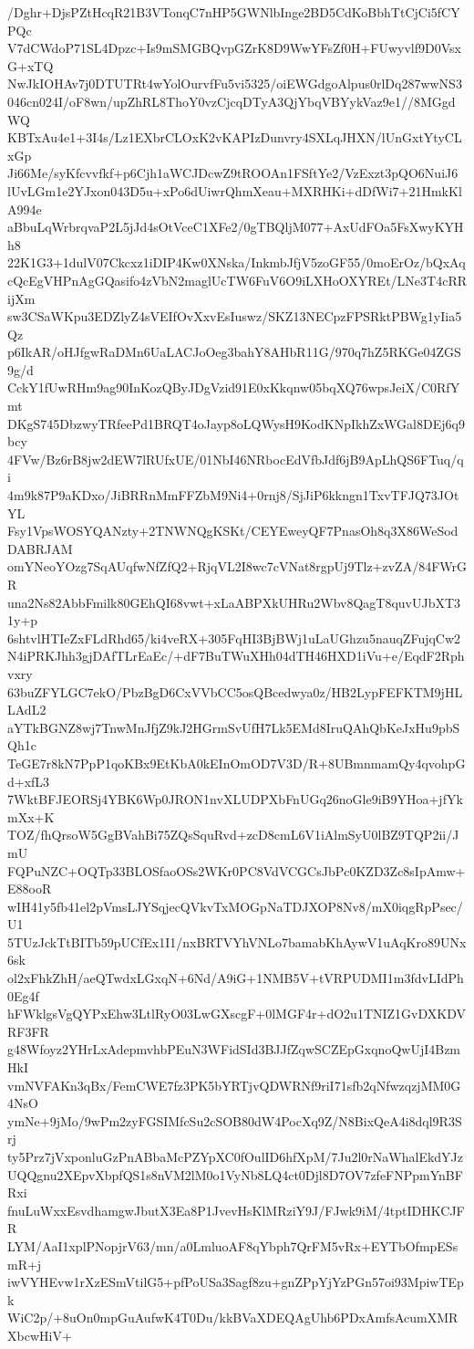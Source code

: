 /Dghr+DjsPZtHcqR21B3VTonqC7nHP5GWNlbInge2BD5CdKoBbhTtCjCi5fCYPQc
V7dCWdoP71SL4Dpzc+Is9mSMGBQvpGZrK8D9WwYFsZf0H+FUwyvlf9D0VsxG+xTQ
NwJkIOHAv7j0DTUTRt4wYolOurvfFu5vi5325/oiEWGdgoAlpus0rlDq287wwNS3
046cn024I/oF8wn/upZhRL8ThoY0vzCjcqDTyA3QjYbqVBYykVaz9e1//8MGgdWQ
KBTxAu4e1+3I4s/Lz1EXbrCLOxK2vKAPIzDunvry4SXLqJHXN/lUnGxtYtyCLxGp
Ji66Me/syKfcvvfkf+p6Cjh1aWCJDcwZ9tROOAn1FSftYe2/VzExzt3pQO6NuiJ6
lUvLGm1e2YJxon043D5u+xPo6dUiwrQhmXeau+MXRHKi+dDfWi7+21HmkKlA994e
aBbuLqWrbrqvaP2L5jJd4sOtVceC1XFe2/0gTBQljM077+AxUdFOa5FsXwyKYHh8
22K1G3+1dulV07Ckcxz1iDIP4Kw0XNska/InkmbJfjV5zoGF55/0moErOz/bQxAq
cQcEgVHPnAgGQasifo4zVbN2maglUcTW6FuV6O9iLXHoOXYREt/LNe3T4cRRijXm
sw3CSaWKpu3EDZlyZ4sVEIfOvXxvEsIuswz/SKZ13NECpzFPSRktPBWg1yIia5Qz
p6IkAR/oHJfgwRaDMn6UaLACJoOeg3bahY8AHbR11G/970q7hZ5RKGe04ZGS9g/d
CckY1fUwRHm9ag90InKozQByJDgVzid91E0xKkqnw05bqXQ76wpsJeiX/C0RfYmt
DKgS745DbzwyTRfeePd1BRQT4oJayp8oLQWysH9KodKNpIkhZxWGal8DEj6q9bcy
4FVw/Bz6rB8jw2dEW7lRUfxUE/01NbI46NRbocEdVfbJdf6jB9ApLhQS6FTuq/qi
4m9k87P9aKDxo/JiBRRnMmFFZbM9Ni4+0rnj8/SjJiP6kkngn1TxvTFJQ73JOtYL
Fsy1VpsWOSYQANzty+2TNWNQgKSKt/CEYEweyQF7PnasOh8q3X86WeSodDABRJAM
omYNeoYOzg7SqAUqfwNfZfQ2+RjqVL2I8wc7cVNat8rgpUj9Tlz+zvZA/84FWrGR
una2Ns82AbbFmilk80GEhQI68vwt+xLaABPXkUHRu2Wbv8QagT8quvUJbXT31y+p
6shtvlHTIeZxFLdRhd65/ki4veRX+305FqHI3BjBWj1uLaUGhzu5nauqZFujqCw2
N4iPRKJhh3gjDAfTLrEaEc/+dF7BuTWuXHh04dTH46HXD1iVu+e/EqdF2Rphvxry
63buZFYLGC7ekO/PbzBgD6CxVVbCC5osQBcedwya0z/HB2LypFEFKTM9jHLLAdL2
aYTkBGNZ8wj7TnwMnJfjZ9kJ2HGrmSvUfH7Lk5EMd8IruQAhQbKeJxHu9pbSQh1c
TeGE7r8kN7PpP1qoKBx9EtKbA0kEInOmOD7V3D/R+8UBmnmamQy4qvohpGd+xfL3
7WktBFJEORSj4YBK6Wp0JRON1nvXLUDPXbFnUGq26noGle9iB9YHoa+jfYkmXx+K
TOZ/fhQrsoW5GgBVahBi75ZQsSquRvd+zcD8cmL6V1iAlmSyU0lBZ9TQP2ii/JmU
FQPuNZC+OQTp33BLOSfaoOSs2WKr0PC8VdVCGCsJbPc0KZD3Zc8sIpAmw+E88ooR
wIH41y5fb41el2pVmsLJYSqjecQVkvTxMOGpNaTDJXOP8Nv8/mX0iqgRpPsec/U1
5TUzJckTtBITb59pUCfEx1I1/nxBRTVYhVNLo7bamabKhAywV1uAqKro89UNx6sk
ol2xFhkZhH/aeQTwdxLGxqN+6Nd/A9iG+1NMB5V+tVRPUDMI1m3fdvLIdPh0Eg4f
hFWklgsVgQYPxEhw3LtlRyO03LwGXscgF+0lMGF4r+dO2u1TNIZ1GvDXKDVRF3FR
g48Wfoyz2YHrLxAdepmvhbPEuN3WFidSId3BJJfZqwSCZEpGxqnoQwUjI4BzmHkI
vmNVFAKn3qBx/FemCWE7fz3PK5bYRTjvQDWRNf9riI71sfb2qNfwzqzjMM0G4NsO
ymNe+9jMo/9wPm2zyFGSIMfcSu2cSOB80dW4PocXq9Z/N8BixQeA4i8dql9R3Srj
ty5Prz7jVxponluGzPnABbaMcPZYpXC0fOulID6hfXpM/7Ju2l0rNaWhalEkdYJz
UQQgnu2XEpvXbpfQS1s8nVM2lM0o1VyNb8LQ4ct0Djl8D7OV7zfeFNPpmYnBFRxi
fnuLuWxxEsvdhamgwJbutX3Ea8P1JvevHsKlMRziY9J/FJwk9iM/4tptIDHKCJFR
LYM/AaI1xplPNopjrV63/mn/a0LmluoAF8qYbph7QrFM5vRx+EYTbOfmpESsmR+j
iwVYHEvw1rXzESmVtilG5+pfPoUSa3Sagf8zu+gnZPpYjYzPGn57oi93MpiwTEpk
WiC2p/+8uOn0mpGuAufwK4T0Du/kkBVaXDEQAgUhb6PDxAmfsAcumXMRXbcwHiV+
